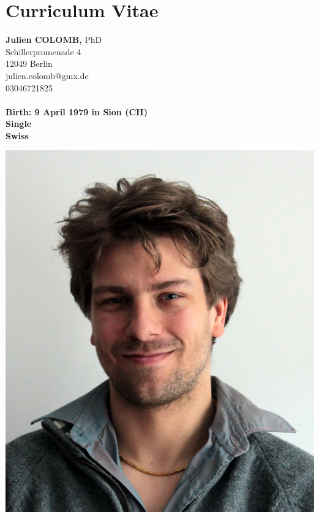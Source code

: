 
\section* {Curriculum Vitae}



\newcommand{\rubrique}[1]{{\textit{\textbf{\large#1}}}\smallskip\\}
\parindent=0in
\addtolength{\parskip}{1.4em}


\small

\begin{minipage}[t]{\textwidth}
    \begin{minipage}[b]{0.5\textwidth}
        \textbf{\Large Julien COLOMB}{\large \textbf, PhD}\\
        Schillerpromenade 4\\
        12049 Berlin\\
        julien.colomb@gmx.de\\
        03046721825\\
        \\
        \textbf{Birth: 9 April 1979 in Sion (CH)}\\
        \textbf{Single}\\
        \textbf{Swiss}
    \end{minipage}\hfill
    \begin{minipage}[b]{0.5\textwidth}
        \begin{flushright}
            \includegraphics[scale=1.3] {figures/photo_CV.jpg}

\end{flushright}
\end{minipage}
\end{minipage}
